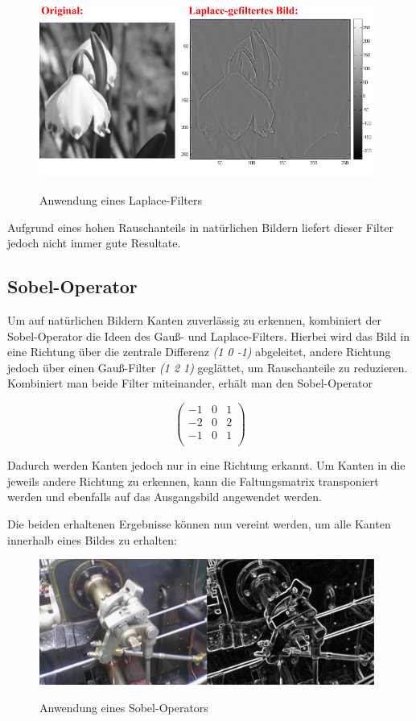 \begin{figure}[ht]
   \centering
     \includegraphics[width=11cm]{Bilder/Laplace} \\
 \caption{Anwendung eines Laplace-Filters}
 \label{fig:Laplace}
\end{figure}

Aufgrund eines hohen Rauschanteils in natürlichen Bildern liefert dieser Filter jedoch nicht immer gute Resultate.

\subsection{Sobel-Operator}
Um auf natürlichen Bildern Kanten zuverlässig zu erkennen, kombiniert der Sobel-Operator die Ideen des Gauß- und Laplace-Filters.
Hierbei wird das Bild in eine Richtung über die zentrale Differenz {\em (1 0 -1)} abgeleitet, andere Richtung jedoch über einen Gauß-Filter {\em (1 2 1)} geglättet,
um Rauschanteile zu reduzieren.
Kombiniert man beide Filter miteinander, erhält man den Sobel-Operator

$$ \left( \begin{array}{rrr}
-1 & 0 & 1 \\
-2 & 0 & 2 \\
-1 & 0 & 1 \\
\end{array}\right) $$

Dadurch werden Kanten jedoch nur in eine Richtung erkannt.
Um Kanten in die jeweils andere Richtung zu erkennen, kann die Faltungsmatrix transponiert werden und ebenfalls auf
das Ausgangsbild angewendet werden.

Die beiden erhaltenen Ergebnisse können nun vereint werden, um alle Kanten innerhalb eines Bildes zu erhalten:

\begin{figure}[ht]
   \centering
     \includegraphics[width=11cm]{Bilder/Sobel} \\
 \caption{Anwendung eines Sobel-Operators}
 \label{fig:Sobel}
\end{figure}

